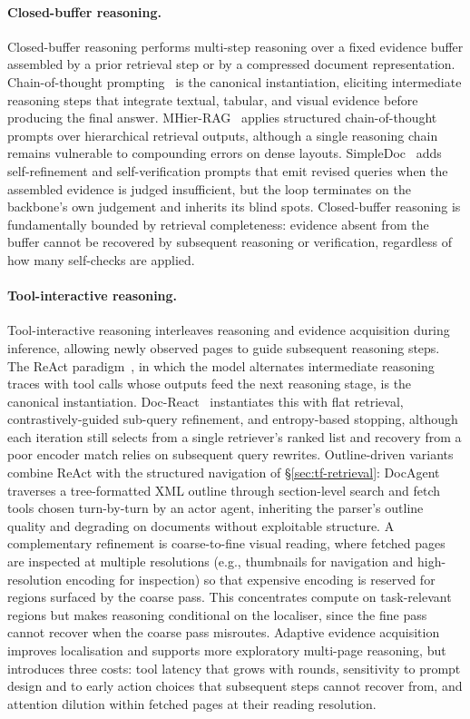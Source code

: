 \documentclass[11pt]{article}
\begin{document}
\paragraph{Closed-buffer reasoning.} Closed-buffer reasoning performs multi-step reasoning over a fixed evidence buffer assembled by a prior retrieval step or by a compressed document representation. Chain-of-thought prompting~\cite{wei2022chainofthought} is the canonical instantiation, eliciting intermediate reasoning steps that integrate textual, tabular, and visual evidence before producing the final answer. MHier-RAG~\cite{gong2025mhierrag} applies structured chain-of-thought prompts over hierarchical retrieval outputs, although a single reasoning chain remains vulnerable to compounding errors on dense layouts. SimpleDoc~\cite{jain2025simpledoc} adds self-refinement and self-verification prompts that emit revised queries when the assembled evidence is judged insufficient, but the loop terminates on the backbone's own judgement and inherits its blind spots. Closed-buffer reasoning is fundamentally bounded by retrieval completeness: evidence absent from the buffer cannot be recovered by subsequent reasoning or verification, regardless of how many self-checks are applied.

\paragraph{Tool-interactive reasoning.} Tool-interactive reasoning interleaves reasoning and evidence acquisition during inference, allowing newly observed pages to guide subsequent reasoning steps. The ReAct paradigm~\cite{yao2022react}, in which the model alternates intermediate reasoning traces with tool calls whose outputs feed the next reasoning stage, is the canonical instantiation. Doc-React~\cite{wu2025docreact} instantiates this with flat retrieval, contrastively-guided sub-query refinement, and entropy-based stopping, although each iteration still selects from a single retriever's ranked list and recovery from a poor encoder match relies on subsequent query rewrites. Outline-driven variants combine ReAct with the structured navigation of \S\ref{sec:tf-retrieval}: DocAgent~\cite{sun2025docagent} traverses a tree-formatted XML outline through section-level search and fetch tools chosen turn-by-turn by an actor agent, inheriting the parser's outline quality and degrading on documents without exploitable structure. A complementary refinement is coarse-to-fine visual reading, where fetched pages are inspected at multiple resolutions (e.g., thumbnails for navigation and high-resolution encoding for inspection) so that expensive encoding is reserved for regions surfaced by the coarse pass. This concentrates compute on task-relevant regions but makes reasoning conditional on the localiser, since the fine pass cannot recover when the coarse pass misroutes. Adaptive evidence acquisition improves localisation and supports more exploratory multi-page reasoning, but introduces three costs: tool latency that grows with rounds, sensitivity to prompt design and to early action choices that subsequent steps cannot recover from, and attention dilution within fetched pages at their reading resolution.
\end{document}
